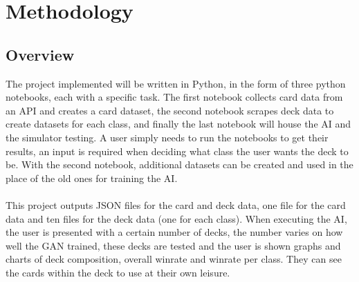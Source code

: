 \documentclass{report} %
\renewcommand{\labelenumi}{\alph{enumi}.} %
\begin{document}
\chapter{Methodology}
\section{Overview}
The project implemented will be written in Python, in the form of three python notebooks, each with a specific task. The first notebook collects card data from an API and creates a card dataset, the second notebook scrapes deck data to create datasets for each class, and finally the last notebook will house the AI and the simulator testing. A user simply needs to run the notebooks to get their results, an input is required when deciding what class the user wants the deck to be. With the second notebook, additional datasets can be created and used in the place of the old ones for training the AI. \\ \\
This project outputs JSON files for the card and deck data, one file for the card data and ten files for the deck data (one for each class). When executing the AI, the user is presented with a certain number of decks, the number varies on how well the GAN trained, these decks are tested and the user is shown graphs and charts of deck composition, overall winrate and winrate per class. They can see the cards within the deck to use at their own leisure.
	
\end{document}
